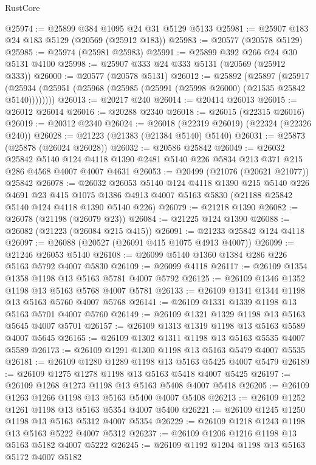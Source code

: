 \begin{lexlean}{RustCore}
\begin{coremodule}
@25974 := @25899 @384 @1095 @24 @31 @5129 @5133
@25981 := @25907 @183 @24 @183 @5129 (@20569 (@25912 @183))
@25983 := @20577 (@20578 @5129)
@25985 := @25974 (@25981 @25983)
@25991 := @25899 @392 @266 @24 @30 @5131 @4100
@25998 := @25907 @333 @24 @333 @5131 (@20569 (@25912 @333))
@26000 := @20577 (@20578 @5131)
@26012 := @25892
    (@25897
      (@25917 (@25934 (@25951 (@25968 (@25985 (@25991 (@25998 @26000) (@21535 @25842 @5140))))))))
@26013 := @20217 @240
@26014 := @20414 @26013
@26015 := @26012 @26014
@26016 := @20288 @2340
@26018 := @26015 (@22315 @26016)
@26019 := @20312 @2340
@26024 := @26018 (@22319 @26019) (@22324 (@22326 @240))
@26028 := @21223 (@21383 (@21384 @5140) @5140)
@26031 := @25873 (@25878 (@26024 @26028))
@26032 := @20586 @25842
@26049 := @26032
    @25842
    @5140
    @124
    @4118
    @1390
    @2481
    @5140
    @226
    @5834
    @213
    @371
    @215
    @286
    @4568
    @4007
    @4007
    @4631
@26053 := @20499 (@21076 (@20621 @21077)) @25842
@26078 := @26032
    @26053
    @5140
    @124
    @4118
    @1390
    @215
    @5140
    @226
    @4691
    @23
    @415
    @1075
    @1386
    @4913
    @4007
    @5163
    @5830
    (@21188 @25842 @5140 @124 @4118 @1390 @5140 @226)
@26079 := @21218 @1390
@26082 := @26078 (@21198 (@26079 @23))
@26084 := @21225 @124 @1390
@26088 := @26082 (@21223 (@26084 @215 @415))
@26091 := @21233 @25842 @124 @4118
@26097 := @26088 (@20527 (@26091 @415 @1075 @4913 @4007))
@26099 := @21246 @26053 @5140
@26108 := @26099 @5140 @1360 @1384 @286 @226 @5163 @5792 @4007 @5830
@26109 := @26099 @4118
@26117 := @26109 @1354 @1358 @1198 @13 @5163 @5781 @4007 @5792
@26125 := @26109 @1346 @1352 @1198 @13 @5163 @5768 @4007 @5781
@26133 := @26109 @1341 @1344 @1198 @13 @5163 @5760 @4007 @5768
@26141 := @26109 @1331 @1339 @1198 @13 @5163 @5701 @4007 @5760
@26149 := @26109 @1321 @1329 @1198 @13 @5163 @5645 @4007 @5701
@26157 := @26109 @1313 @1319 @1198 @13 @5163 @5589 @4007 @5645
@26165 := @26109 @1302 @1311 @1198 @13 @5163 @5535 @4007 @5589
@26173 := @26109 @1291 @1300 @1198 @13 @5163 @5479 @4007 @5535
@26181 := @26109 @1280 @1289 @1198 @13 @5163 @5425 @4007 @5479
@26189 := @26109 @1275 @1278 @1198 @13 @5163 @5418 @4007 @5425
@26197 := @26109 @1268 @1273 @1198 @13 @5163 @5408 @4007 @5418
@26205 := @26109 @1263 @1266 @1198 @13 @5163 @5400 @4007 @5408
@26213 := @26109 @1252 @1261 @1198 @13 @5163 @5354 @4007 @5400
@26221 := @26109 @1245 @1250 @1198 @13 @5163 @5312 @4007 @5354
@26229 := @26109 @1218 @1243 @1198 @13 @5163 @5222 @4007 @5312
@26237 := @26109 @1206 @1216 @1198 @13 @5163 @5182 @4007 @5222
@26245 := @26109 @1192 @1204 @1198 @13 @5163 @5172 @4007 @5182

\end{coremodule}
\end{lexlean}

